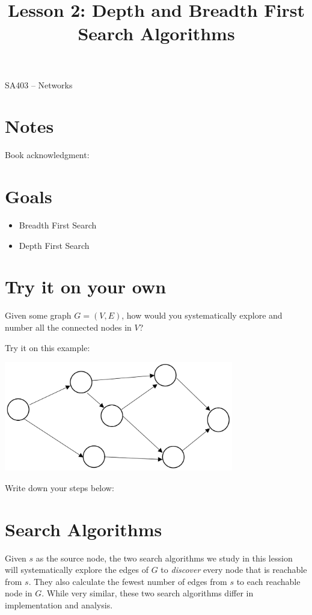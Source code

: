 \documentclass[12pt]{article}
\makeatletter
\theoremstyle{definition}
\newcommand{\graphbox}[5]%
{
\begin{tikzpicture}
     [>=latex,scale=#5]
     
     \draw [->,very thick] (#1, 0) -- (#2, 0) node[right] {$x$};
     \draw [->,very thick] (0, #3) -- (0, #4) node[above] {$y$};
     
     \draw[step=1cm,thick,dotted] (#1,#3) grid (#2,#4);
   \end{tikzpicture}
   }
\renewcommand{\maketitle}{
  \noindent SA403 -- Networks \\

  \begin{center}\Large{\textbf{\@title}}\end{center}
}
\makeatother
\begin{document}

\title{Lesson 2: Depth and Breadth First Search Algorithms}


\maketitle


\section*{Notes}

Book acknowledgment:
\section*{Goals}
\begin{itemize}
\item Breadth First Search
\item Depth First Search
\end{itemize}

\section{Try it on your own}

Given some graph $G = (V,E)$, how would you systematically explore and number all the connected nodes in $V$?

Try it on this example:

\begin{center}
\includegraphics[width=10cm]{searchgraph}
\end{center}

Write down your steps below:
\newpage


\section{Search Algorithms}

Given $s$ as the source node, the two search algorithms we study in this lession will systematically explore the edges of $G$ to \emph{discover} every node that is reachable from $s$. They also calculate the fewest number of edges from $s$ to each reachable node in $G$. While very similar, these two search algorithms differ in implementation and analysis.
\end{document}
